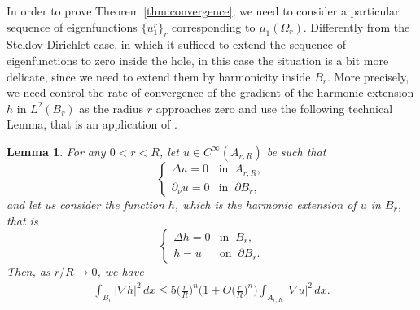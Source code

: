 \documentclass[12pt,reqno]{amsart}
\newtheorem{lemma}{Lemma}[section]
\numberwithin{equation}{section}
\numberwithin{theorem}{section}
\numberwithin{equation}{section}
\numberwithin{theorem}{section}
\begin{document}
In order to prove Theorem \ref{thm:convergence}, we need to consider a particular sequence of eigenfunctions $\{u_1^r\}_r$ corresponding to $\mu_1(\Omega_r)$. Differently from the Steklov-Dirichlet case, in which it sufficed to extend the sequence of eigenfunctions to zero inside the hole, in this case the situation is a bit more delicate, since we need to extend them by harmonicity inside $B_r$. More precisely,  we need control the rate of convergence of the gradient of the harmonic extension $h$ in $L^2(B_r)$  as the radius $r$ approaches zero and use the following technical Lemma, that is an application of \cite[Lemma 12]{girouard2021steklov}. %
\begin{lemma}\label{lem:estimateharmonicgradient}
    For any $0<r<R$, let $u\in C^\infty(\overline{A_{r,R}})$ be such that
    \begin{equation*}
        \begin{cases}
         \Delta u = 0 & \text{in}\;\; A_{r,R},\\
         \partial_\nu u = 0 & \text{in}\;\; \partial B_r,
        \end{cases}
    \end{equation*}
    and let us consider the function $h$, which is the harmonic extension of $u$ in $B_r$, that is
    \begin{equation*}
        \begin{cases}
        \Delta h = 0 &\text{in}\;\; B_r,\\
        h=u &\text{on}\;\; \partial B_r.
        \end{cases}
    \end{equation*}
  Then, as $r/R\to 0$, we have
  \begin{align} \label{eq:gradestimate}
      \int_{B_r}|{\nabla h}|^2\,dx\leq 5 \bigg(\frac{r}{R}\bigg)^n\bigg(1+O\bigg(\frac{r}{R}\bigg)^n\bigg)\int_{A_{r,R}}|{\nabla u}|^2\,dx. 
  \end{align}
\end{lemma}
\end{document}
